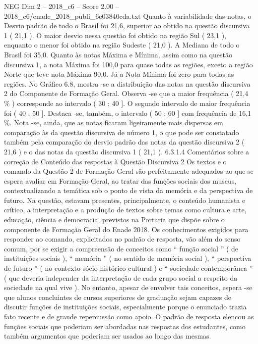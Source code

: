 \begin{textsample}{NEG Dim 2 – 2018\_c6 – Score 2.00 – 2018\_c6/enade\_2018\_publi\_6e03840cda.txt}
Quanto à variabilidade das notas, o Desvio padrão de todo o Brasil foi 21,6, superior ao obtido na questão discursiva 1 ( 21,1 ).
O maior desvio nessa questão foi obtido na região Sul ( 23,1 ), enquanto o menor foi obtido na região Sudeste ( 21,0 ).
A Mediana de todo o Brasil foi 35,0.
Quanto às notas Máxima e Mínima, assim como na questão discursiva 1, a nota Máxima foi 100,0 para quase todas as regiões, exceto a região Norte que teve nota Máxima 90,0.
Já a Nota Mínima foi zero para todas as regiões.
No Gráfico 6.8, mostra -se a distribuição das notas na questão discursiva 2 do Componente de Formação Geral.
Observa -se que a maior frequência ( 21,4 \% ) corresponde ao intervalo ( 30 ; 40 ].
O segundo intervalo de maior frequência foi ( 40 ; 50 ].
Destaca -se, também, o intervalo ( 50 ; 60 ] com frequência de 16,1 \%.
Nota -se, ainda, que as notas ficaram ligeiramente mais dispersas em comparação às da questão discursiva de número 1, o que pode ser constatado também pela comparação do desvio padrão das notas da questão discursiva 2 ( 21,6 ) e o das notas da questão discursiva 1 ( 21,1 ). 6.3.1.4 Comentários sobre a correção de Conteúdo das respostas à Questão Discursiva 2 Os textos e o comando da Questão 2 de Formação Geral são perfeitamente adequados ao que se espera avaliar em Formação Geral, ao tratar das funções sociais dos museus, contextualizando a temática sob o ponto de vista da memória e da perspectiva de futuro.
Na questão, estavam presentes, principalmente, o conteúdo humanista e crítico, a interpretação e a produção de textos sobre temas como cultura e arte, educação, ciência e democracia, previstos na Portaria que dispõe sobre o componente de Formação Geral do Enade 2018.
Os conhecimentos exigidos para responder ao comando, explicitados no padrão de resposta, vão além do senso comum, por se exigir a compreensão de conceitos como “ função social ” ( de instituições sociais ), “ memória ” ( no sentido de memória social ), “ perspectiva de futuro ” ( no contexto sócio-histórico-cultural ) e “ sociedade contemporânea ” ( que deveria independer da interpretação de cada grupo social a respeito da sociedade na qual vive ).
No entanto, apesar de envolver tais conceitos, espera -se que alunos concluintes de cursos superiores de graduação sejam capazes de discutir funções de instituições sociais, especialmente porque o enunciado trazia fato recente e de grande repercussão como apoio.
O padrão de resposta elencou as funções sociais que poderiam ser abordadas nas respostas dos estudantes, como também argumentos que poderiam ser usados ao longo das mesmas.

\end{textsample}
